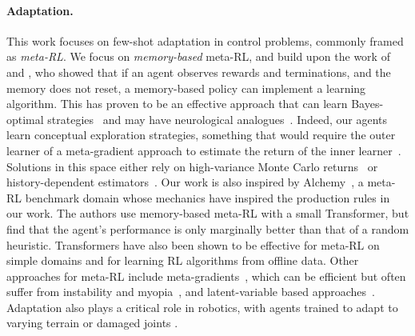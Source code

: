 \documentclass[11pt, a4paper, logo, copyright]{deepmind}
\begin{document}
\paragraph{Adaptation.}
This work focuses on few-shot adaptation in control problems, commonly framed as \emph{meta-RL}. We focus on \emph{memory-based} meta-RL, and build upon the work of \citet{duan2017rl} and \citet{wang2016learning}, who showed that if an agent observes rewards and terminations, and the memory does not reset, a memory-based policy can implement a learning algorithm. This has proven to be an effective approach that can learn Bayes-optimal strategies~\citep{ortega2019metalearning,mikulik2020metatrained} and may have neurological analogues~\citep{wang2018prefrontal}. Indeed, our agents learn conceptual exploration strategies, something that would require the outer learner of a meta-gradient approach to estimate the return of the inner learner~\citep{stadie2018some}. Solutions in this space either rely on high-variance Monte Carlo returns~\citep{stadie2018some,garcia2019meta,vuorio2021no} or history-dependent estimators~\citep{zheng2020can}. Our work is also inspired by Alchemy~\citep{wang2102alchemy}, a meta-RL benchmark domain whose mechanics have inspired the production rules in our work. The authors use memory-based meta-RL with a small Transformer, but find that the agent's performance is only marginally better than that of a random heuristic. Transformers have also been shown to be effective for meta-RL on simple domains \citep{melo2022transformers} and for learning RL algorithms \citep{laskin2022algorithmdistillation} from offline data. Other approaches for meta-RL include meta-gradients~\citep{andrychowicz2016learning,maml_finn_icml17,xu2018meta, flennerhag2022bootstrapped}, which can be efficient but often suffer from instability and myopia~\citep{metz2021gradients,vuorio2021no,flennerhag2022bootstrapped}, and latent-variable based approaches~\citep{finn2018probabilistic,humplik2019meta,rakelly2019efficient,zintgraf2019varibad}. Adaptation also plays a critical role in robotics, with agents trained to adapt to varying terrain \citep{clavera2018learning, kumar2021rma} or damaged joints \citep{Cully2015RobotsTC}.
\end{document}
